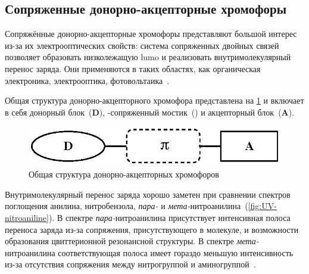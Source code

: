 


\subsection{Сопряженные донорно-акцепторные хромофоры}

Сопряжённые донорно-акцепторные хромофоры представляют большой интерес из-за их электрооптических свойств: система сопряженных двойных связей позволяет образовать низколежащую \ac{lumo} и реализовать внутримолекулярный перенос заряда.
Они применяются в таких областях, как органическая электроника, электрооптика, фотовольтаика~\cite{Bures2014a}.

Общая структура донорно-акцепторного хромофора представлена на \ref{fig:D-p-A_chromophores} и включает в себя донорный блок~(\textbf{D}), \chempi-сопряженный мостик~({\Large\chempi}) и акцепторный блок~(\textbf{A}).

\begin{figure}[h!]
    \centering
    \includegraphics{sections/literature/img/D-p-A_chromophores.eps}
    \caption{Общая структура донорно-акцепторных хромофоров}
    \label{fig:D-p-A_chromophores}
\end{figure}

Внутримолекулярный перенос заряда хорошо заметен при сравнении спектров поглощения анилина, нитробензола, \emph{пара-} и \emph{мета-}нитроанилина~(\ref{fig:UV-nitroaniline}).
В спектре \emph{пара-}нитроанилина присутствует интенсивная полоса переноса заряда из-за сопряжения, присутствующего в молекуле, и возможности образования цвиттерионной резонансной структуры.
В спектре \emph{мета-}нитроанилина соответствующая полоса имеет гораздо меньшую интенсивность из-за отсутствия сопряжения между нитрогруппой и аминогруппой~\cite{Bures2014a}.

